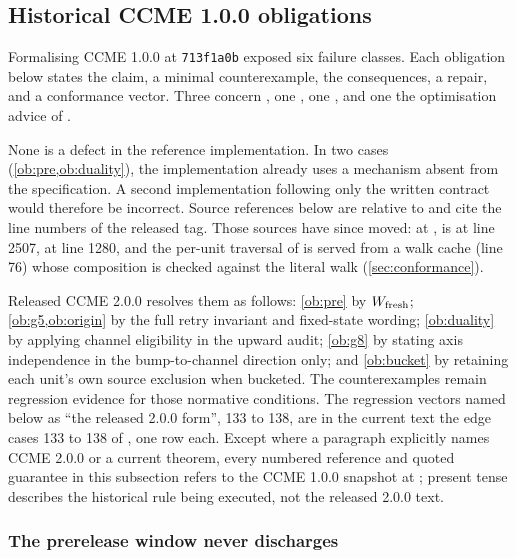 \subsection{Historical CCME 1.0.0 obligations}
\label{sec:obligations-historical}

Formalising CCME 1.0.0 at \texttt{713f1a0b} exposed six failure classes. Each obligation below
states the claim, a minimal counterexample, the consequences, a repair, and a
conformance vector. Three concern , one , one
, and one the optimisation advice of .

None is a defect in the reference implementation. In two cases
(\cref{ob:pre,ob:duality}), the implementation already uses a mechanism absent
from the specification. A second implementation following only the written
contract would therefore be incorrect. Source references below are
relative to  and cite the line numbers of
the released  tag. Those sources have since
moved: at ,  is at 
line 2507,  at line 1280, and the per-unit traversal
of  is served from a walk cache (line 76) whose
composition is checked against the literal walk (\cref{sec:conformance}).

Released CCME 2.0.0 resolves them as follows: \cref{ob:pre} by $W_{\rm fresh}$;
\cref{ob:g5,ob:origin} by the full retry invariant and fixed-state wording;
\cref{ob:duality} by applying channel eligibility in the upward audit;
\cref{ob:g8} by stating axis independence in the bump-to-channel direction
only; and \cref{ob:bucket} by retaining each unit's own source exclusion when
bucketed. The counterexamples remain regression evidence for those normative
conditions. The regression vectors named below as ``the released 2.0.0
form'', 133 to 138, are in the current text the edge cases 133 to 138 of
, one row each. Except where a paragraph explicitly names CCME 2.0.0 or a current
theorem, every numbered \spec{} reference and quoted guarantee in this subsection
refers to the CCME 1.0.0 snapshot at ; present tense describes
the historical rule being executed, not the released 2.0.0 text.

\subsubsection{The prerelease window never discharges}


